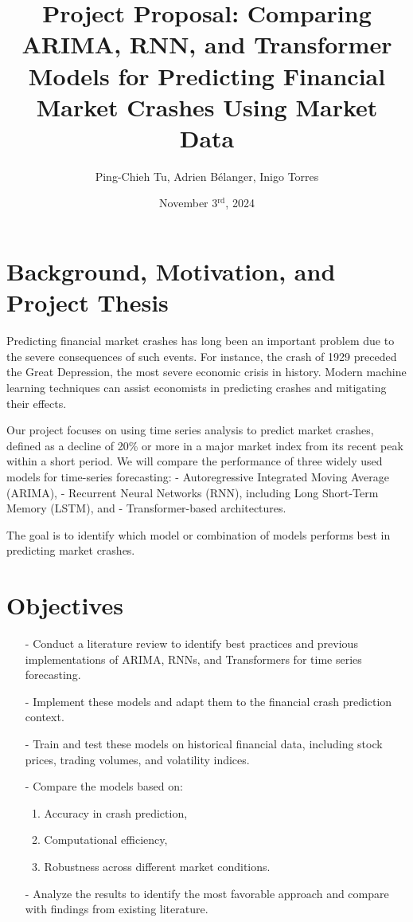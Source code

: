 \documentclass[12pt, letterpaper]{article}
\title{\Large Project Proposal: Comparing ARIMA, RNN, and Transformer Models for Predicting Financial Market Crashes Using Market Data\\}
\author{Ping-Chieh Tu, Adrien Bélanger, Inigo Torres}
\date{November 3$^{\text{rd}}$, 2024}
\begin{document}
\maketitle

\section*{Background, Motivation, and Project Thesis}
    Predicting financial market crashes has long been an important problem due to the severe consequences of such events. For instance, the crash of 1929 preceded the Great Depression, the most severe economic crisis in history. Modern machine learning techniques can assist economists in predicting crashes and mitigating their effects.

    Our project focuses on using time series analysis to predict market crashes, defined as a decline of 20\% or more in a major market index from its recent peak within a short period. We will compare the performance of three widely used models for time-series forecasting: 
    - Autoregressive Integrated Moving Average (ARIMA),
    - Recurrent Neural Networks (RNN), including Long Short-Term Memory (LSTM), and 
    - Transformer-based architectures.

    The goal is to identify which model or combination of models performs best in predicting market crashes.
\section*{Objectives}
        \begin{itemize}
            \item[-] Conduct a literature review to identify best practices and previous implementations of ARIMA, RNNs, and Transformers for time series forecasting.
            \item[-] Implement these models and adapt them to the financial crash prediction context.
            \item[-] Train and test these models on historical financial data, including stock prices, trading volumes, and volatility indices.
            \item[-] Compare the models based on:
              \begin{enumerate}[label=\alph*.]
                \item Accuracy in crash prediction,
                \item Computational efficiency,
                \item Robustness across different market conditions.
              \end{enumerate}
            \item[-] Analyze the results to identify the most favorable approach and compare with findings from existing literature.
        \end{itemize}
\end{document}
